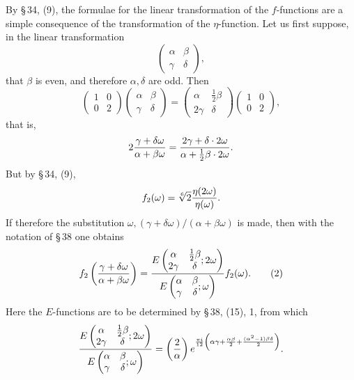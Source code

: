 \documentclass[11pt]{article}
\newcommand{\Jac}[2]{\left(\frac{#1}{#2}\right)}
\begin{document}
By \S\,34, (9), the formulae for the linear transformation of the $f$-functions are a simple consequence of the transformation of the $\eta$-function. Let us first suppose, in the linear transformation
\[
\begin{pmatrix}\alpha&\beta\\ \gamma&\delta\end{pmatrix},
\]
that $\beta$ is even, and therefore $\alpha,\delta$ are odd. Then
\begin{equation}
\begin{pmatrix}1&0\\0&2\end{pmatrix}
\begin{pmatrix}\alpha&\beta\\ \gamma&\delta\end{pmatrix}
=\begin{pmatrix}\alpha&\frac12\beta\\2\gamma&\delta\end{pmatrix}
\begin{pmatrix}1&0\\0&2\end{pmatrix},
\tag{1}
\end{equation}
that is,
\[
2{\gamma+
\delta\omega\over\alpha+
\beta\omega}
={2\gamma+
\delta\cdot2\omega\over\alpha+\frac12\beta\cdot2\omega}.
\]
But by \S\,34, (9),
\[
f_2(\omega)=\sqrt[6]{2}{\eta(2\omega)\over\eta(\omega)}.
\]
If therefore the substitution $\omega, (\gamma+
\delta\omega)/(\alpha+
\beta\omega)$ is made, then with the notation of \S\,38 one obtains
\begin{equation}
f_2\left({\gamma+
\delta\omega\over\alpha+
\beta\omega}\right)
={E\left(\begin{matrix}\alpha&\frac12\beta\\2\gamma&\delta\end{matrix};2\omega\right)
\over
E\left(\begin{matrix}\alpha&\beta\\\gamma&\delta\end{matrix};\omega\right)}f_2(\omega).
\tag{2}
\end{equation}
Here the $E$-functions are to be determined by \S\,38, (15), 1, from which
\[
{E\left(\begin{matrix}\alpha&\frac12\beta\\2\gamma&\delta\end{matrix};2\omega\right)
\over
E\left(\begin{matrix}\alpha&\beta\\\gamma&\delta\end{matrix};\omega\right)}
=
\Jac{2}{\alpha}e^{{\pi i\over12}\left(\alpha\gamma+{\alpha\beta\over2}+{(\alpha^2-1)\beta\delta\over2}\right)}.
\]
\end{document}
